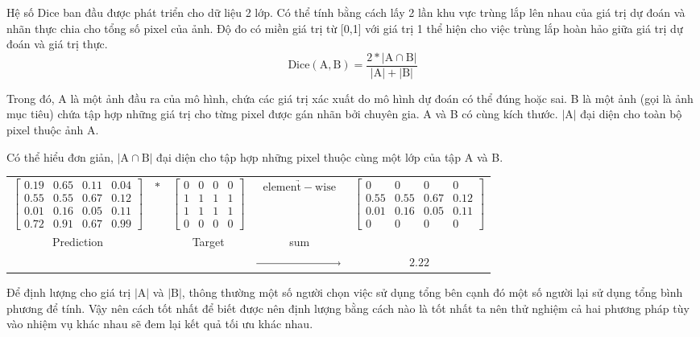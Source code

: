Hệ số Dice ban đầu được phát triển cho dữ liệu 2 lớp. Có thể tính bằng cách lấy 2 lần khu vực trùng lắp lên nhau của giá trị dự đoán và nhãn thực chia cho tổng số pixel của ảnh. Độ đo có miền giá trị từ [0,1] với giá trị 1 thể hiện cho việc trùng lắp hoàn hảo giữa giá trị dự đoán và giá trị thực.
\begin{equation}
	\mathrm{Dice(A, B)} = \mathrm{\frac{2 * |A \cap B|}{|A| + |B|}}
\end{equation} 

Trong đó, A là một ảnh đầu ra của mô hình, chứa các giá trị xác xuất do mô hình dự đoán có thể đúng hoặc sai. B là một ảnh (gọi là ảnh mục tiêu) chứa tập hợp những giá trị cho từng pixel được gán nhãn bởi chuyên gia. A và B có cùng kích thước. $|\mathrm{A}|$ đại diện cho toàn bộ pixel thuộc ảnh A. \par 

Có thể hiểu đơn giản, $|\mathrm{A} \cap \mathrm{B}|$ đại diện cho tập hợp những pixel thuộc cùng một lớp của tập A và B. 

\hspace{-2.0cm}
\begin{tabular}{c c c c c}
	$\left[
	\begin{matrix}
		0.19 & 0.65 & 0.11 & 0.04\\
		0.55 & 0.55 & 0.67 & 0.12\\
		0.01 & 0.16 & 0.05 & 0.11\\
		0.72 & 0.91 & 0.67 & 0.99
	\end{matrix}
	\right]$ & $*$ &
	$\left[
	\begin{matrix}
		0 & 0 & 0 & 0\\
		1 & 1 & 1 & 1\\
		1 & 1 & 1 & 1\\
		0 & 0 & 0 & 0
	\end{matrix}
	\right]$ & $ \underrightarrow{\mathrm{element-wise}}$ &
	$\left[
	\begin{matrix}
		0	 & 0 	& 0 	& 0\\
		0.55 & 0.55 & 0.67 	& 0.12\\
		0.01 & 0.16 & 0.05 	& 0.11\\
		0 	 & 0 	& 0 	& 0
	\end{matrix}
	\right]$ \\ 
	Prediction &  & Target & sum   & \\
	& & & $ \myarrow[2.6cm] $ & $2.22$ 
\end{tabular}

Để định lượng cho giá trị $|\mathrm{A}|$ và $|\mathrm{B}|$, thông thường một số người chọn việc sử dụng tổng bên cạnh đó một số người lại sử dụng tổng bình phương để tính. Vậy nên cách tốt nhất để biết được nên định lượng bằng cách nào là tốt nhất ta nên thử nghiệm cả hai phương pháp tùy vào nhiệm vụ khác nhau sẽ đem lại kết quả tối ưu khác nhau.

